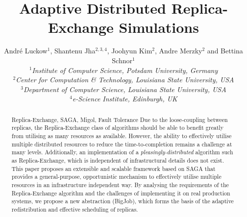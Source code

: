 \documentclass{rspublic}
\title[Adaptive Distributed Replica-Exchange Simulations]{Adaptive Distributed
  Replica-Exchange Simulations}
\author[Luckow, Jha, Kim, Merzky, Schnor]{
  Andr\'e Luckow$^{1}$, Shantenu Jha$^{2,3,4}$, Joohyun Kim$^{2}$, Andre Merzky$^{2}$ and Bettina Schnor$^{1}$\\
  \small{\emph{$^{1}$Institute of Computer Science, Potsdam University, Germany}}\\
  \small{\emph{$^{2}$Center for Computation \& Technology, Louisiana State University, USA}}\\
  \small{\emph{$^{3}$Department of Computer Science, Louisiana State
      University, USA}}\\
  \small{\emph{$^{4}$e-Science Institute, Edinburgh, UK}}\\
}
\begin{document}
 


\maketitle    


\begin{abstract}{Replica-Exchange, SAGA, Migol, Fault Tolerance}  
  Due to the loose-coupling between replicas, the Replica-Exchange
  class of algorithms should be able to benefit greatly from utilising
  as many resources as available. However, the ability to effectively
  utilise multiple distributed resources to reduce the
  time-to-com\-ple\-tion remains a challenge at many levels.
  Additionally, an implementation of a {\it pleasingly-distributed}
  algorithm such as Replica-Exchange, which is independent of
  infrastructural details does not exist.  This paper proposes an
  extensible and scalable framework based on SAGA that provides a
  general-purpose, opportunistic mechanism to effectively utilise
  multiple resources in an infrastructure independent way. By
  analysing the requirements of the Replica-Exchange algorithm and the
  challenges of implementing it on real production systems, we propose
  a new abstraction (BigJob), which forms the basis of the adaptive
  redistribution and effective scheduling of replicas.
\end{abstract}
\end{document}
